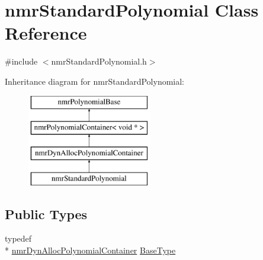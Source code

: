 \hypertarget{classnmr_standard_polynomial}{\section{nmr\-Standard\-Polynomial Class Reference}
\label{classnmr_standard_polynomial}
}


{\ttfamily \#include $<$nmr\-Standard\-Polynomial.\-h$>$}

Inheritance diagram for nmr\-Standard\-Polynomial\-:\begin{figure}[H]
\begin{center}
\leavevmode
\includegraphics[height=4.000000cm]{d5/d1e/classnmr_standard_polynomial}
\end{center}
\end{figure}
\subsection*{Public Types}
\begin{DoxyCompactItemize}
\item 
typedef \\*
\hyperlink{classnmr_dyn_alloc_polynomial_container}{nmr\-Dyn\-Alloc\-Polynomial\-Container} \hyperlink{classnmr_standard_polynomial_ae0b28e9d73a5480047ee5d85be633b89}{Base\-Type}
\end{DoxyCompactItemize}
